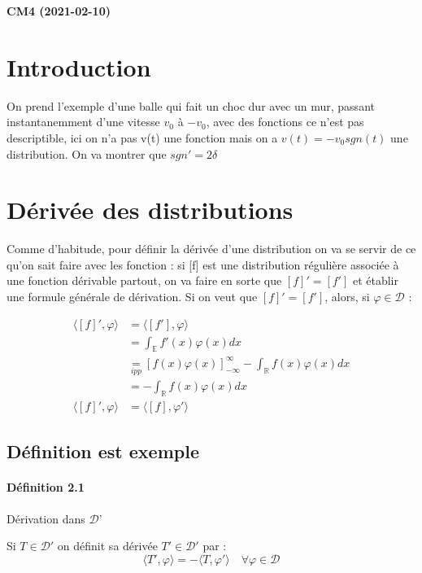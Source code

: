 \documentclass[12pt,a4paper]{report}
\newcommand{\ens}[1]{\mathbb{#1}}
\newcommand{\fphi}{\quad \forall \varphi \in \mathcal{D}}
\newcommand{\D}{\ensuremath{\mathcal{D}}}
\begin{document}
\begin{center}
\textbf{CM4 (2021-02-10)}
\end{center}

\section{Introduction}

On prend l'exemple d'une balle qui fait un choc dur avec un mur, passant instantanemment d'une vitesse \(v_0\) à \(-v_0\), avec des fonctions ce n'est pas descriptible, ici on n'a pas v(t) une fonction mais on a \(v(t) = -v_0 sgn(t)\) une distribution.
On va montrer que \(sgn' = 2\delta\)

\section{Dérivée des distributions}

Comme d'habitude, pour définir la dérivée d'une distribution on va se servir de ce qu'on sait faire avec les fonction : si [f] est une distribution régulière associée à une fonction dérivable partout, on va faire en sorte que \([f]' = [f']\) et établir une formule générale de dérivation. Si on veut que \([f]' = [f']\), alors, si \(\varphi \in \D\) :

\begin{align*}
	\langle [f]', \varphi \rangle &= \langle [f'], \varphi \rangle\\
	&= \int_\ens{E} f'(x) \varphi(x) dx\\
	&\underset{ipp}{=} \left[f(x) \varphi(x)\right]_{-\infty}^{\infty} - \int_\ens{R} f(x) \varphi(x) dx\\
	&= -\int_\ens{R} f(x) \varphi(x) dx\\
	\langle [f]', \varphi \rangle &= \langle [f], \varphi' \rangle
\end{align*}

\subsection{Définition est exemple}

\paragraph{Définition 2.1} Dérivation dans \D'

Si \(T \in \D'\) on définit sa dérivée \(T' \in \D'\) par :
\[
	\langle T', \varphi \rangle = - \langle T, \varphi' \rangle \fphi
\]
\end{document}
